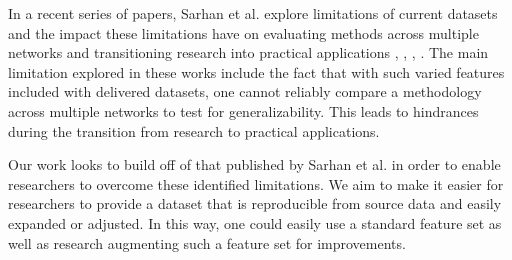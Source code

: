 \documentclass[sigconf, anonymous, screen]{acmart}
\begin{document}
In a recent series of papers, Sarhan et al. explore limitations of current datasets and the impact these limitations have on evaluating methods across multiple networks and transitioning research into practical applications \cite{sarhan2020netflow}, \cite{sarhan2021cyber}, \cite{Sarhan2021}, \cite{sarhan_arxiv2021}.
The main limitation explored in these works include the fact that with such varied features included with delivered datasets, one cannot reliably compare a methodology across multiple networks to test for generalizability.
This leads to hindrances during the transition from research to practical applications. 

Our work looks to build off of that published by Sarhan et al. in order to enable researchers to overcome these identified limitations.
We aim to make it easier for researchers to provide a dataset that is reproducible from source data and easily expanded or adjusted.
In this way, one could easily use a standard feature set as well as research augmenting such a feature set for improvements.
\end{document}

